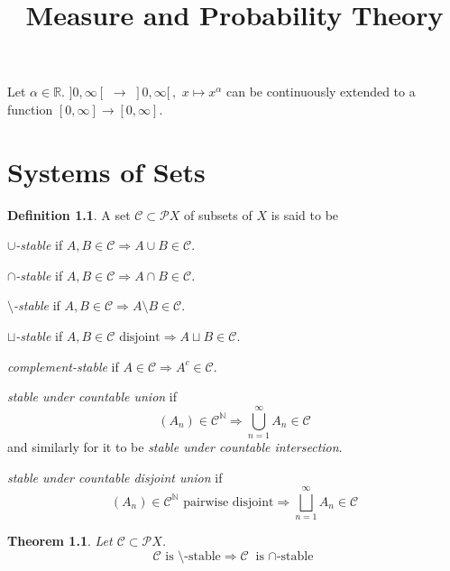 \documentclass[11pt, a4paper, openany]{book}
\title{Measure and Probability Theory}
\author{}
\date{}
\newtheorem{thm}{Theorem}\newtheorem{lem}{Lemma}\newtheorem{crl}{Corollary}
\theoremstyle{definition}
\newtheorem{define}{Definition}\newtheorem{exam}{Example}\newtheorem{remark}{Remark}
\newenvironment{tight_enumerate}{\begin{enumerate}\itemsep -0.2em}{\end{enumerate}}
\begin{document}
\frontmatter\maketitle\tableofcontents\mainmatter
\setlength{\abovedisplayskip}{6pt}
\setlength{\belowdisplayskip}{6pt}

Let $\alpha\in\mathbb{R}$. $]0,\infty[\,\,\rightarrow \,\,]0,\infty[ \,,\,\,x\mapsto x^{\alpha}$ can be continuously extended to a function $[0,\infty]\rightarrow [0,\infty]$.

\chapter{Systems of Sets}
    \begin{define}
        A set $\mathscr{C}\subset\mathscr{P}X$ of subsets of $X$ is said to be
        \begin{tight_enumerate}
            \item \textit{$\cup$-stable} if $A,B\in \mathscr{C}\Rightarrow A\cup B\in\mathscr{C}$.
            \item \textit{$\cap$-stable} if $A,B\in \mathscr{C}\Rightarrow A\cap B\in\mathscr{C}$.
            \item \textit{$\setminus$-stable} if $A,B\in \mathscr{C}\Rightarrow A\setminus B\in\mathscr{C}$.
            \item \textit{$\sqcup$-stable} if $A,B\in \mathscr{C}\text{ disjoint}\Rightarrow A\sqcup B\in\mathscr{C}$.
            \item \textit{complement-stable} if $A\in\mathscr{C}\Rightarrow A^c\in\mathscr{C}$.
            \item \textit{stable under countable union} if
            \[
                (A_n)\in\mathscr{C}^\mathbb{N}\Longrightarrow \bigcup_{n=1}^\infty A_n\in\mathscr{C}
            \]
            and similarly for it to be \textit{stable under countable intersection}.
            \item \textit{stable under countable disjoint union} if
            \[
                (A_n)\in \mathscr{C}^\mathbb{N}\text{ pairwise disjoint}\Longrightarrow \bigsqcup_{n=1}^\infty A_n\in\mathscr{C}
            \]
        \end{tight_enumerate}
    \end{define}
    \begin{thm}\label{setminus stable implies cap stable}
        Let $\mathscr{C}\subset\mathscr{P}X$.
        \[
            \mathscr{C}\text{ is $\setminus$-stable}\Longrightarrow\mathscr{C}\text{ is $\cap$-stable}
        \]
    \end{thm}
\end{document}
